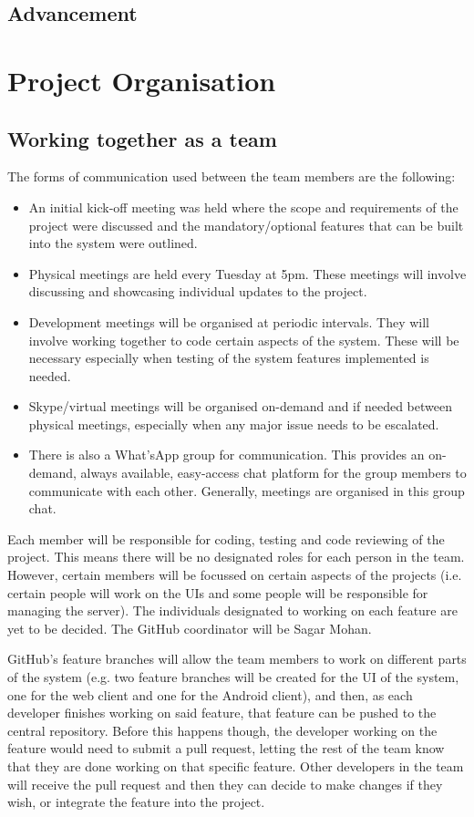 \documentclass[11pt,a4paper]{article}
\begin{document}
\subsection{Advancement}



\section{Project Organisation}
\subsection{Working together as a team}
The forms of communication used between the team members are the following:
\begin{itemize}
\item An initial kick-off meeting was held where the scope and requirements of the project were discussed and the mandatory/optional features that can be built into the system were outlined.
\item Physical meetings are held every Tuesday at 5pm. These meetings will involve discussing and showcasing individual updates to the project. 
\item Development meetings will be organised at periodic intervals. They will involve working together to code certain aspects of the system. These will be necessary especially when testing of the system features implemented is needed.
\item Skype/virtual meetings will be organised on-demand and if needed between physical meetings, especially when any major issue needs to be escalated. 
\item There is also a What'sApp group for communication. This provides an on-demand, always available, easy-access chat platform for the group members to communicate with each other. Generally, meetings are organised in this group chat.
\end{itemize}
Each member will be responsible for coding, testing and code reviewing of the project. This means there will be no designated roles for each person in the team. However, certain members will be focussed on certain aspects of the projects (i.e. certain people will work on the UIs and some people will be responsible for managing the server). The individuals designated to working on each feature are yet to be decided. The GitHub coordinator will be Sagar Mohan.

GitHub’s feature branches will allow the team members to work on different parts of the system (e.g. two feature branches will be created for the UI of the system, one for the web client and one for the Android client), and then, as each developer finishes working on said feature, that feature can be pushed to the central repository. Before this happens though, the developer working on the feature would need to submit a pull request, letting the rest of the team know that they are done working on that specific feature. Other developers in the team will receive the pull request and then they can decide to make changes if they wish, or integrate the feature into the project.
\end{document}

